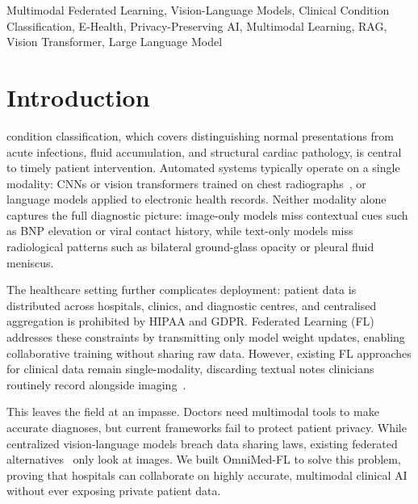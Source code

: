 \documentclass[letterpaper, conference]{IEEEtran}
\begin{document}
\begin{IEEEkeywords}
Multimodal Federated Learning, Vision-Language Models, Clinical Condition Classification, E-Health, Privacy-Preserving AI, Multimodal Learning, RAG, Vision Transformer, Large Language Model
\end{IEEEkeywords}

\section{Introduction}

 condition classification, which covers
distinguishing normal presentations from acute infections, fluid
accumulation, and structural cardiac pathology, is central to timely patient intervention. Automated systems typically operate on a single modality: CNNs or vision transformers trained on chest radiographs~\cite{Rajpurkar2017,Irvin2019}, or language models applied to electronic health records.
Neither modality alone captures the full diagnostic picture: image-only
models miss contextual cues such as BNP elevation or viral contact
history, while text-only models miss radiological patterns such as
bilateral ground-glass opacity or pleural fluid meniscus.

The healthcare setting further complicates deployment: patient data is
distributed across hospitals, clinics, and diagnostic centres, and
centralised aggregation is prohibited by HIPAA and GDPR. Federated
Learning (FL) addresses these constraints by
transmitting only model weight updates, enabling collaborative training
without sharing raw data. However, existing FL approaches for clinical
data remain single-modality, discarding textual notes clinicians
routinely record alongside imaging~\cite{Zhao2025,Mao2025,Yan2024}.

This leaves the field at an impasse. Doctors need multimodal tools to make accurate diagnoses, but current frameworks fail to protect patient privacy. While centralized vision-language models breach data sharing laws, existing federated alternatives~\cite{Zhao2025,Yan2024} only look at images. We built OmniMed-FL to solve this problem, proving that hospitals can collaborate on highly accurate, multimodal clinical AI without ever exposing private patient data.
\end{document}
